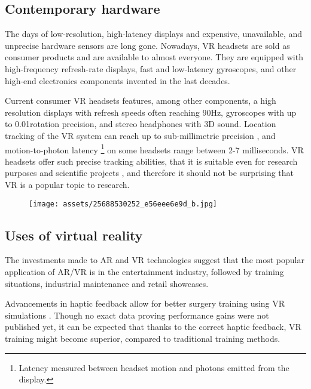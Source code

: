 \hypertarget{x-contemporary-hardware}{\subsection*{Contemporary hardware}}
The days of low-resolution, high-latency displays and expensive, unavailable,
and unprecise hardware sensors are long gone. Nowadays, VR headsets are
sold as consumer products and are available to almost everyone. They are
equipped with high-frequency refresh-rate displays, fast and low-latency
gyroscopes, and other high-end electronics components invented in the last
decades.


Current consumer VR headsets features, among other components,
a high resolution displays with refresh speeds often reaching 90Hz, gyroscopes
with up to 0.01\degree rotation precision, and stereo headphones with 3D sound.
Location tracking of the VR system can reach up to sub-millimetric precision
\hyperlink{vivenasa}{}, and motion-to-photon latency
\footnote{Latency measured between headset motion and photons emitted from the display.}
on some headsets range between 2-7 milliseconds. \hyperlink{mtpltc}{} \hyperlink{xinwiki}{}
VR headsets offer such precise tracking abilities, that it is suitable even
for research purposes and scientific projects \hyperlink{vivepbsr}{}, and therefore
it should not be surprising that VR is a popular topic to research.


\begin{figure}[h]{}
\centering\texttt{[image: assets/25688530252\_e56eee6e9d\_b.jpg]}
\caption{}

\end{figure}

\hypertarget{x-uses-of-virtual-reality}{\subsection*{Uses of virtual reality}}
The investments made to AR and VR technologies suggest
that the most popular application of AR/VR is in the entertainment industry,
followed
by training situations, industrial maintenance and retail showcases.
\hyperlink{statistavr}{}


Advancements in haptic feedback allow for better surgery training using
VR simulations \hyperlink{vhfcrmisvrt}{}. Though no exact data proving performance gains
were not published yet, it can be expected that thanks to the correct haptic
feedback, VR training might become superior, compared to traditional
training methods. \hyperlink{vrsrgr}{}


